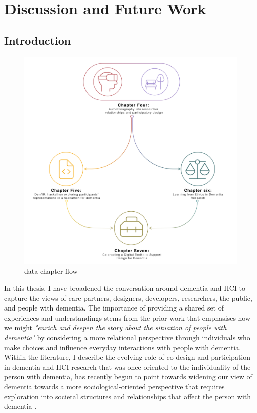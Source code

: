 \chapter{Discussion and Future Work}
\label{Discussion}

\section{Introduction}
\label{Discussion:Intro}

\begin{figure}[htp]
\centering
\includegraphics[width=0.8\linewidth]{Images/Thesis_Narrative/Narrative_Full.png}
\caption{data chapter flow}
\label{fig:NarrativeFlow}
\end{figure}

In this thesis, I have broadened the conversation around dementia and HCI to capture the views of care partners, designers, developers, researchers, the public, and people with dementia. The importance of providing a shared set of experiences and understandings stems from the prior work that emphasises how we might \textit{"enrich and deepen the story about the situation of people with dementia"} \citep{bartlett2010broadening} by considering a more relational perspective through individuals who make choices and influence everyday interactions with people with dementia. Within the literature, I describe the evolving role of co-design and participation in dementia and HCI research that was once oriented to the individuality of the person with dementia, has recently begun to point towards widening our view of dementia towards a more sociological-oriented perspective that requires exploration into societal structures and relationships that affect the person with dementia \citep{lazar_critical_2017}. 


